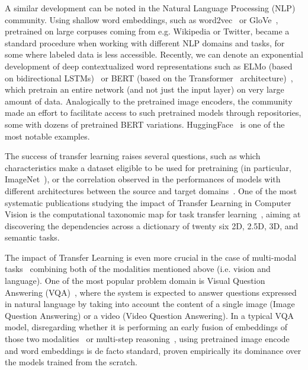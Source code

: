 A similar development can be noted in the Natural Language Processing (NLP) community.
Using shallow word embeddings, such as word2vec~\cite{mikolov2013distributed} or GloVe~\cite{pennington2014glove}, pretrained on large corpuses coming from e.g. Wikipedia or Twitter, became a standard procedure when working with different NLP domains and tasks, for some where labeled data is less accessible.
Recently, we can denote an exponential development of deep contextualized word representations such as ELMo (based on bidirectional LSTMs)~\cite{peters2018deep} or BERT (based on the Transformer~\cite{vaswani2017attention} architecture)~\cite{devlin2018bert}, which pretrain an entire network (and not just the input layer) on very large amount of data.
Analogically to the pretrained image encoders, the community made an effort to facilitate access to such pretrained models through repositories, some with dozens of pretrained BERT variations. HuggingFace~\cite{wolf2019transformers} is one of the most notable examples.

The success of transfer learning raises several questions, such as which characteristics make a dataset eligible to be used for pretraining (in particular, ImageNet~\cite{huh2016makes}), or the correlation observed in the performances of models with different architectures between the source and target domains~\cite{kornblith2019better}.
One of the most systematic publications studying the impact of Transfer Learning in Computer Vision is the computational taxonomic map for task transfer learning~\cite{zamir2018taskonomy}, aiming at discovering the dependencies across a dictionary of twenty six 2D, 2.5D, 3D, and semantic tasks.

The impact of Transfer Learning is even more crucial in the case of multi-modal tasks~\cite{mogadala2019trends} combining both of the modalities mentioned above (i.e. vision and language).
One of the most popular problem domain is Visual Question Answering (VQA)~\cite{malinowski2014multi,antol2015vqa}, where the system is expected to answer questions expressed in natural language by taking into account the content of a single image (Image Question Answering) or a video (Video Question Answering).
In a typical VQA model, disregarding whether it is performing an early fusion of embeddings of those two modalities~\cite{malinowski2018visual} or multi-step reasoning~\cite{hudson2018compositional}, using pretrained image encode and word embeddings is de facto standard, proven empirically its dominance over the models trained from the scratch.

